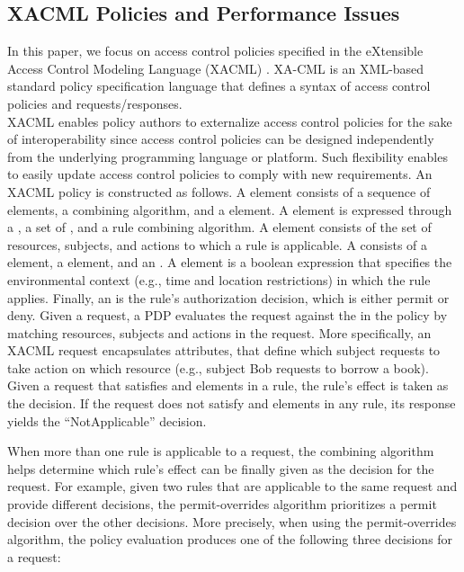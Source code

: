 \subsection{XACML Policies and Performance Issues}
In this paper, we focus on access control policies specified in the eXtensible Access Control Modeling Language (XACML) \cite{sunxacml}.
XA-CML is an XML-based standard policy specification language that defines a syntax of access control policies and
requests/responses. \\XACML enables policy authors to externalize access control policies for the sake of interoperability since access control policies can be designed 
independently from the underlying programming language or platform. Such flexibility enables to easily update access control policies to comply with new requirements.
An XACML policy is constructed as follows.
A  element consists of a sequence of  elements, a combining algorithm, and
a  element. A  element is expressed through a , a set of , and a rule combining algorithm. 
A  element consists of the set of resources, subjects, and actions to which a rule is applicable. A  consists of a 
 element, a  element, and an . A  element is a boolean expression that specifies the
environmental context (e.g., time and location restrictions) in which the rule applies.
Finally, an  is the rule's authorization decision, which is either permit or deny.
Given a request, a PDP evaluates the request against the  in the policy by matching resources, subjects and actions in the request.
More specifically, an XACML request encapsulates attributes, that define which subject requests to take action on which resource (e.g., subject Bob requests to borrow a book).
Given a request that satisfies  and  elements in a rule, the rule's effect
is taken as the decision.
If the request does not satisfy  and  elements in any rule, its response yields the ``NotApplicable'' decision.

When more than one rule is applicable to a request, the combining algorithm helps determine which rule's effect can be finally given as the decision for the request.
For example, given two rules that are applicable to the same request and provide different decisions,
the permit-overrides algorithm prioritizes a permit decision over the other decisions.
More precisely, when using the permit-overrides algorithm, the policy evaluation produces one of the following three decisions for a request: 

